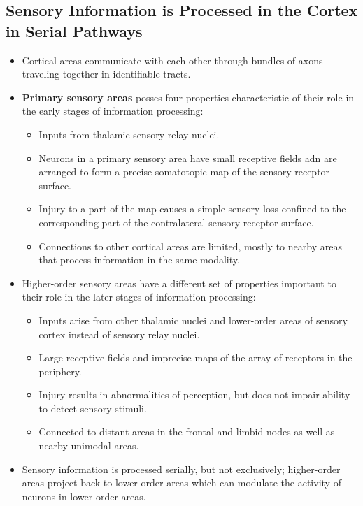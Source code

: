 \documentclass[12pt,a4paper]{article}
\begin{document}
\subsection{Sensory Information is Processed in the Cortex in Serial Pathways}
\begin{itemize}
    \item Cortical areas communicate with each other through bundles of axons traveling together in identifiable tracts.
    \item \textbf{Primary sensory areas} posses four properties characteristic of their role in the early stages of information processing:
        \begin{itemize}
            \item Inputs from thalamic sensory relay nuclei.
            \item Neurons in a primary sensory area have small receptive fields adn are arranged to form a precise somatotopic map of the sensory receptor surface.
            \item Injury to a part of the map causes a simple sensory loss confined to the corresponding part of the contralateral sensory receptor surface.
            \item Connections to other cortical areas are limited, mostly to nearby areas that process information in the same modality.
        \end{itemize}
    \item Higher-order sensory areas have a different set of properties important to their role in the later stages of information processing:
        \begin{itemize}
            \item Inputs arise from other thalamic nuclei and lower-order areas of sensory cortex instead of sensory relay nuclei.
            \item Large receptive fields and imprecise maps of the array of receptors in the periphery.
            \item Injury results in abnormalities of perception, but does not impair ability to detect sensory stimuli.
            \item Connected to distant areas in the frontal and limbid nodes as well as nearby unimodal areas.
        \end{itemize}
    \item Sensory information is processed serially, but not exclusively; higher-order areas project back to lower-order areas which can modulate the activity of neurons in lower-order areas.

\end{itemize}
\end{document}
